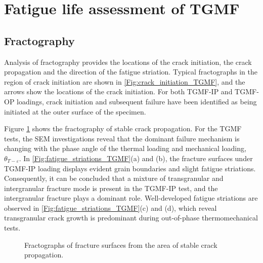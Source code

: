 \documentclass[preprint,5p,twocolumn,10pt,sort&compress]{elsarticle}
\begin{document}
\section{Fatigue life assessment of TGMF}

\subsection{Fractography}

Analysis of fractography provides the locations of the crack initiation, the crack propagation and the direction of the fatigue striation.
Typical fractographs in the region of crack initiation are shown in \autoref{Fig:crack_initiation_TGMF}, and the arrows show the locations of the crack initiation. For both TGMF-IP and TGMF-OP loadings, crack initiation and subsequent failure have been identified as being initiated at the outer surface of the specimen.

Figure \ref{Fig:fatigue_striations_TGMF} shows the fractography of stable crack propagation. For the TGMF tests, the SEM investigations reveal that the dominant failure mechanism is changing with the phase angle of the thermal loading and mechanical loading, $\theta_{T-\varepsilon}$.
In \autoref{Fig:fatigue_striations_TGMF}(a) and (b), the fracture surfaces under TGMF-IP loading displays evident grain boundaries and slight fatigue striations. Consequently, it can be concluded that a mixture of transgranular and intergranular fracture mode is present in the TGMF-IP test, and the intergranular fracture plays a dominant role.
Well-developed fatigue striations are observed in \autoref{Fig:fatigue_striations_TGMF}(c) and (d), which reveal transgranular crack growth is predominant during out-of-phase thermomechanical tests.

\begin{figure}[!ht]
  \caption{Fractographs of fracture surfaces from the area of stable crack propagation.}
  \label{Fig:fatigue_striations_TGMF}
\end{figure}
\end{document}
